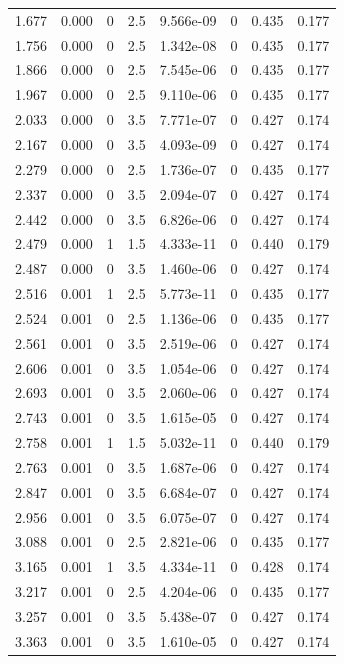 \documentclass[preview]{standalone}
\begin{document}
{{\begin{tabular}{L{1.2cm}C{1.2cm} C{0.3cm}C{0.5cm} C{1.4cm}C{1.4cm} C{1.4cm}C{1.4cm}}
  1.677  &  0.000  & 0     & 2.5 &  9.566e-09  & 0  & 0.435 &  0.177   \\ 
  1.756  &  0.000  & 0     & 2.5 &  1.342e-08  & 0  & 0.435 &  0.177   \\ 
  1.866  &  0.000  & 0     & 2.5 &  7.545e-06  & 0  & 0.435 &  0.177   \\ 
  1.967  &  0.000  & 0     & 2.5 &  9.110e-06  & 0  & 0.435 &  0.177   \\ 
  2.033  &  0.000  & 0     & 3.5 &  7.771e-07  & 0  & 0.427 &  0.174   \\ 
  2.167  &  0.000  & 0     & 3.5 &  4.093e-09  & 0  & 0.427 &  0.174   \\ 
  2.279  &  0.000  & 0     & 2.5 &  1.736e-07  & 0  & 0.435 &  0.177   \\ 
  2.337  &  0.000  & 0     & 3.5 &  2.094e-07  & 0  & 0.427 &  0.174   \\ 
  2.442  &  0.000  & 0     & 3.5 &  6.826e-06  & 0  & 0.427 &  0.174   \\ 
  2.479  &  0.000  & 1     & 1.5 &  4.333e-11  & 0  & 0.440 &  0.179   \\ 
  2.487  &  0.000  & 0     & 3.5 &  1.460e-06  & 0  & 0.427 &  0.174   \\ 
  2.516  &  0.001  & 1     & 2.5 &  5.773e-11  & 0  & 0.435 &  0.177   \\ 
  2.524  &  0.001  & 0     & 2.5 &  1.136e-06  & 0  & 0.435 &  0.177   \\ 
  2.561  &  0.001  & 0     & 3.5 &  2.519e-06  & 0  & 0.427 &  0.174   \\ 
  2.606  &  0.001  & 0     & 3.5 &  1.054e-06  & 0  & 0.427 &  0.174   \\ 
  2.693  &  0.001  & 0     & 3.5 &  2.060e-06  & 0  & 0.427 &  0.174   \\ 
  2.743  &  0.001  & 0     & 3.5 &  1.615e-05  & 0  & 0.427 &  0.174   \\ 
  2.758  &  0.001  & 1     & 1.5 &  5.032e-11  & 0  & 0.440 &  0.179   \\ 
  2.763  &  0.001  & 0     & 3.5 &  1.687e-06  & 0  & 0.427 &  0.174   \\ 
  2.847  &  0.001  & 0     & 3.5 &  6.684e-07  & 0  & 0.427 &  0.174   \\ 
  2.956  &  0.001  & 0     & 3.5 &  6.075e-07  & 0  & 0.427 &  0.174   \\ 
  3.088  &  0.001  & 0     & 2.5 &  2.821e-06  & 0  & 0.435 &  0.177   \\ 
  3.165  &  0.001  & 1     & 3.5 &  4.334e-11  & 0  & 0.428 &  0.174   \\ 
  3.217  &  0.001  & 0     & 2.5 &  4.204e-06  & 0  & 0.435 &  0.177   \\ 
  3.257  &  0.001  & 0     & 3.5 &  5.438e-07  & 0  & 0.427 &  0.174   \\ 
  3.363  &  0.001  & 0     & 3.5 &  1.610e-05  & 0  & 0.427 &  0.174   \\ 
\hline 
\end{tabular} 

}}
\end{document}

